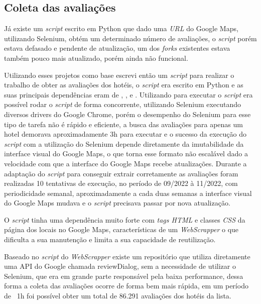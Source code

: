 \subsection{Coleta das avaliações}
\label{cap:metodologia:sec:conjunto_dados:sec:coleta}

Já existe um \emph{script} escrito em Python \cite{gaspa93scrapper2023} que dado uma \emph{URL} do Google Maps, utilizando Selenium, obtém um determinado número de avaliações, o \emph{script} porém estava defasado e pendente de atualização, um dos \emph{forks} existentes  estava também pouco mais atualizado, porém ainda não funcional.

Utilizando esses projetos como base escrevi então um \emph{script} para realizar o trabalho de obter as avaliações dos hotéis, o \emph{script} era escrito em Python e as suas principais dependências eram de \cite{selenium2023}, ,  e . Utilizando  para executar o \emph{script} era possível rodar o \emph{script} de forma concorrente, utilizando Selenium executando diversos drivers do Google Chrome, porém o desempenho do Selenium para esse tipo de tarefa não é rápido e eficiente, a busca das avaliações para apenas um hotel demorava aproximadamente 3h para executar e o sucesso da execução do \emph{script} com a utilização do Selenium depende diretamente da imutabilidade da interface visual do Google Maps, o que torna esse formato não escalável dado a velocidade com que a interface do Google Maps recebe atualizações. Durante a adaptação do \emph{script} para conseguir extrair corretamente as avaliações foram realizadas 10 tentativas de execução, no período de 09/2022 à 11/2022, com periodicidade semanal, aproximadamente a cada duas semanas a interface visual do Google Maps mudava e o \emph{script} precisava passar por nova atualização.

O \emph{script} tinha uma dependência muito forte com \emph{tags HTML} e classes \emph{CSS} da página dos locais no Google Maps, características de um \emph{WebScrapper} o que dificulta a sua manutenção e limita a sua capacidade de reutilização.

Baseado no \emph{script} do \emph{WebScrapper} existe um repositório que utiliza diretamente uma API do Google chamada reviewDialog, sem a necessidade de utilizar o Selenium, que era em grande parte responsável pela baixa performance, dessa forma a coleta das avaliações ocorre de forma bem mais rápida, em um período de ~1h foi possível obter um total de 86.291 avaliações dos hotéis da lista.
